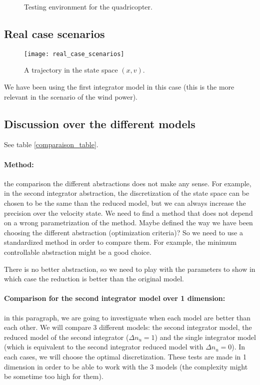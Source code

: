 \begin{figure}
	\center
	
	\caption{Testing environment for the quadricopter.}
	\label{fig:environment}
\end{figure}



\subsection{Real case scenarios}

\begin{figure}[!ht]
  \centering
  \texttt{[image: real\_case\_scenarios]}
  \caption{A trajectory in the state space $(x,v)$.}
\end{figure}

We have been using the first integrator model in this case (this is the more relevant in the scenario of the wind power).

\subsection{Discussion over the different models}
See table \ref{comparaison_table}.

\paragraph{Method:}
the comparison the different abstractions does not make any sense.
For example, in the second integrator abstraction, the discretization of the state space can be chosen to be the same than the reduced model, but we can always increase the precision over the velocity state.
We need to find a method that does not depend on a wrong parametrization of the method. Maybe defined the way we have been choosing the different abstraction (optimization criteria)?
So we need to use a standardized method in order to compare them.
For example, the minimum controllable abstraction might be a good choice.

There is no better abstraction, so we need to play with the parameters to show in which case the reduction is better than the original model.


\paragraph{Comparison for the second integrator model over 1 dimension:} in this paragraph, we are going to investiguate when each model are better than each other.
We will compare 3 different models:
the second integrator model,
the reduced model of the second integrator ($\Delta n_u = 1$)
and the single integrator model (which is equivalent to the second integrator reduced model with $\Delta n_u = 0$).
In each cases, we will choose the optimal discretization. These tests are made in 1 dimension in order to be able to work with the 3 models (the complexity might be sometime too high for them).

